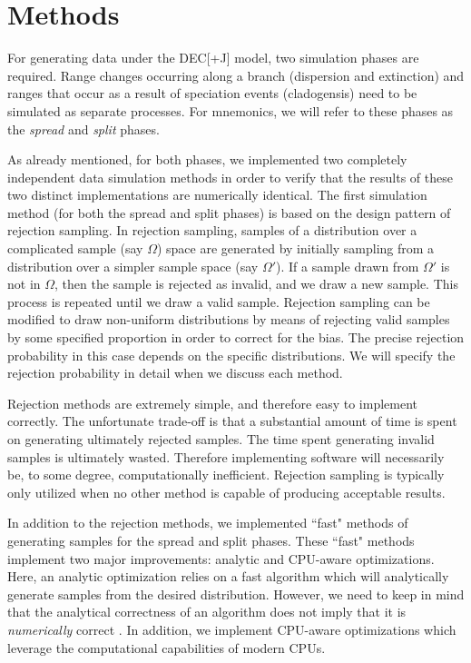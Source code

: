 \documentclass[a4paper]{article}
\begin{document}
\section{Methods}

For generating data under the DEC[+J] model, two simulation phases are required. 
Range changes occurring along a branch (dispersion and extinction) and ranges that occur as a result of speciation events (cladogensis) need to be simulated as separate processes.
For mnemonics, we will refer to these phases as the \textit{spread} and \textit{split} phases.

As already mentioned, for both phases, we implemented two completely independent data simulation methods in order to verify that the
results of these two distinct implementations are numerically identical. 
The first simulation method (for both the spread and split phases) is based on the design pattern of rejection
sampling.
In rejection sampling, samples of a distribution over a complicated sample (say $\Omega$) space are generated by
initially sampling from a distribution over a simpler sample space (say $\Omega'$). 
If a sample drawn from $\Omega'$ is not in $\Omega$, then the sample is rejected as invalid, and we draw a new sample.
This process is repeated until we draw a valid sample\footnotemark.
Rejection sampling can be modified to draw non-uniform distributions by means of rejecting valid samples
by some specified proportion in order to correct for the bias.
The precise rejection probability in this case depends on the specific distributions. 
We will specify the rejection probability in detail when we discuss each method.


Rejection methods are extremely simple, and therefore easy to implement correctly.
The unfortunate trade-off is that a substantial amount of time is spent on generating ultimately rejected samples. 
The time spent generating invalid samples is ultimately wasted.
Therefore implementing software will necessarily be, to some degree, computationally inefficient.
Rejection sampling is typically only utilized when no other method is capable of producing acceptable results.

In addition to the rejection methods, we implemented ``fast" methods of generating samples for the spread and split phases.
These ``fast" methods implement two major improvements: analytic and CPU-aware optimizations.
Here, an analytic optimization relies on a fast algorithm which will analytically generate samples from the desired distribution.
However, we need to keep in mind that the analytical correctness of an algorithm does not imply that it is \textit{numerically} correct
\cite{goldberg_what_1991, noauthor_ieee_1985}.
In addition, we implement CPU-aware optimizations which leverage the computational capabilities of modern CPUs.
\end{document}
